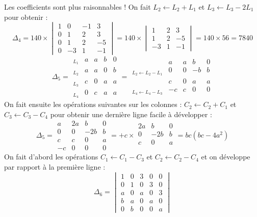 {{Les coefficients sont plus raisonnables !
On fait $L_2\leftarrow L_2+L_1$ et $L_3\leftarrow L_3-2L_1$
pour obtenir :
$$\Delta_4 = 140 \times 
\begin{vmatrix}
1 & 0 & -1 & 3 \\ 0 & 1 & 2 & 3 \\ 0 & 1 & 2 & -5 \\ 0 & -3 & 1 & -1
\end{vmatrix}
=140 \times \begin{vmatrix}
 1 & 2 & 3 \\  1 & 2 & -5 \\ -3 & 1 & -1
\end{vmatrix}
= 140 \times 56 = 7840$$
$$\Delta_5 =\begin{array}{l|cccc|} 
_{L_1} &a&a&b&0 \\ _{L_2} & a&a&0&b \\ _{L_3} & c&0&a&a \\ _{L_4} &0&c&a&a
\end{array}
= \begin{array}{l|cccc|} 
 &a&a&b&0 \\ _{L_2\leftarrow L_2-L_1} & 0&0&-b&b \\  & c&0&a&a \\ _{L_4\leftarrow L_4-L_3} & -c&c&0&0
\end{array}
$$
On fait ensuite les opérations suivantes sur les colonnes :
$C_2 \leftarrow C_2+C_1$ et $C_3 \leftarrow C_3-C_4$ pour obtenir 
une dernière ligne facile à développer :
$$\Delta_5 
= \begin{array}{|cccc|} 
 a&2a&b&0 \\ 0&0&-2b&b \\  c&c&0&a \\ -c&0&0&0
\end{array}
= +c \times \begin{array}{|ccc|} 
 2a&b&0 \\ 0&-2b&b \\  c&0&a \\
 \end{array} = bc(bc-4a^2)
$$
On fait d'abord les opérations $C_1 \leftarrow C_1-C_3$ et $C_2 \leftarrow C_2-C_4$
et on développe par rapport à la première ligne :
$$\Delta_6 = \begin{vmatrix}
1&0&3&0&0 \\ 0&1&0&3&0 \\ a&0&a&0&3 \\ b&a&0&a&0 \\ 0&b&0&0&a  
\end{vmatrix}
$$}}
